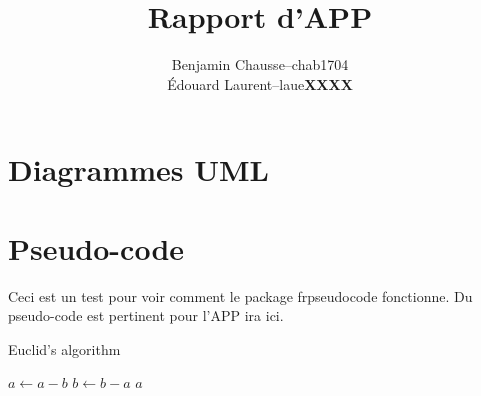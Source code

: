 \documentclass[a11paper, 11pt]{article}
\title{Rapport d'APP}
\author{
  \addtolength{\tabcolsep}{-0.4em}
  \begin{tabular}{rcl} %
  Benjamin Chausse & -- & chab1704 \\
  Édouard Laurent  & -- & laue\textbf{XXXX} \\ %
  \end{tabular}
}
\begin{document}
\maketitle
\newpage
\tableofcontents
\newpage

\section{Diagrammes UML}

\section{Pseudo-code}

Ceci est un test pour voir comment le package frpseudocode fonctionne.
Du pseudo-code est pertinent pour l'APP ira ici.

\begin{algorithm}
\caption{Euclid's algorithm}\label{alg:euclid}
\begin{algorithmic}[1]
        \State $a \gets a - b$
      \Else
        \State $b \gets b - a$
      \EndIf
    \EndWhile
    \State \Return $a$
  \EndFunction
\end{algorithmic}
\end{algorithm}



\end{document}
